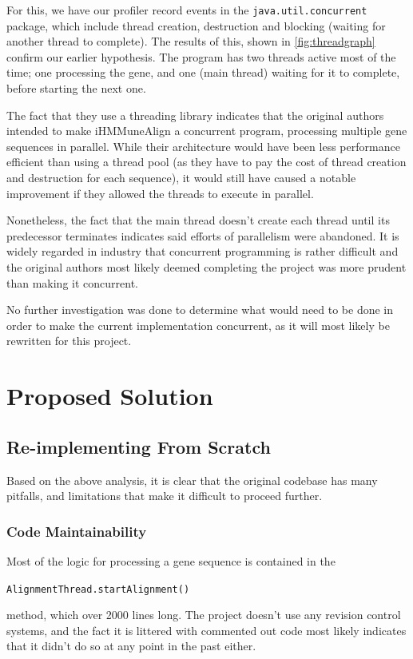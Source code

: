 For this, we have our profiler record events in the \texttt{java.util.concurrent} package, which include thread creation, destruction and blocking (waiting for another thread to complete). The results of this, shown in \autoref{fig:threadgraph} confirm our earlier hypothesis. The program has two threads active most of the time; one processing the gene, and one (main thread) waiting for it to complete, before starting the next one.

The fact that they use a threading library indicates that the original authors intended to make iHMMuneAlign a concurrent program, processing multiple gene sequences in parallel. While their architecture would have been less performance efficient than using a thread pool (as they have to pay the cost of thread creation and destruction for each sequence), it would still have caused a notable improvement if they allowed the threads to execute in parallel.

Nonetheless, the fact that the main thread doesn't create each thread until its predecessor terminates indicates said efforts of parallelism were abandoned. It is widely regarded in industry that concurrent programming is rather difficult and the original authors most likely deemed completing the project was more prudent than making it concurrent.

No further investigation was done to determine what would need to be done in order to make the current implementation concurrent, as it will most likely be rewritten for this project.

\chapter{Proposed Solution}

\section{Re-implementing From Scratch}
\label{sec:reimplementing}

Based on the above analysis, it is clear that the original codebase has many pitfalls, and limitations that make it difficult to proceed further.

\subsection{Code Maintainability}
Most of the logic for processing a gene sequence is contained in the \begin{center}
  \texttt{AlignmentThread.startAlignment()}
\end{center}
method, which over 2000 lines long. The project doesn't use any revision control systems, and the fact it is littered with commented out code most likely indicates that it didn't do so at any point in the past either.

